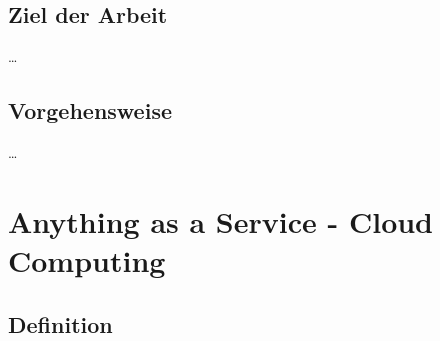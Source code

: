 \documentclass[12pt,toc=bib,toc=listof]{scrreprt}
\begin{document}

\section{Ziel der Arbeit} %
\label{sec:ziel_der_arbeit}

\ldots


\section{Vorgehensweise} %
\label{sec:vorgehensweise}

\ldots


\chapter{Anything as a Service - Cloud Computing} %
\label{sec:Anything as a Service und Cloud Computing}



\section{Definition} %
\label{sec:Definition}
\end{document}
